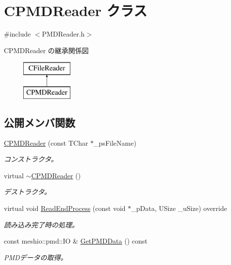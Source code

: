 \hypertarget{class_c_p_m_d_reader}{}\section{C\+P\+M\+D\+Reader クラス}
\label{class_c_p_m_d_reader}


{\ttfamily \#include $<$P\+M\+D\+Reader.\+h$>$}

C\+P\+M\+D\+Reader の継承関係図\begin{figure}[H]
\begin{center}
\leavevmode
\includegraphics[height=2.000000cm]{class_c_p_m_d_reader}
\end{center}
\end{figure}
\subsection*{公開メンバ関数}
\begin{DoxyCompactItemize}
\item 
\hyperlink{class_c_p_m_d_reader_a8d2c4bdfa2c288fe4d3507a26c7f13a7}{C\+P\+M\+D\+Reader} (const T\+Char $\ast$\+\_\+ps\+File\+Name)
\begin{DoxyCompactList}\small\item\em コンストラクタ。 \end{DoxyCompactList}\item 
virtual \hyperlink{class_c_p_m_d_reader_a3e1afba2bd86e420c731ba5c114d2ec5}{$\sim$\+C\+P\+M\+D\+Reader} ()
\begin{DoxyCompactList}\small\item\em デストラクタ。 \end{DoxyCompactList}\item 
virtual void \hyperlink{class_c_p_m_d_reader_a326af26b1815aaa4b088b037fb76e05f}{Read\+End\+Process} (const void $\ast$\+\_\+p\+Data, U\+Size \+\_\+u\+Size) override
\begin{DoxyCompactList}\small\item\em 読み込み完了時の処理。 \end{DoxyCompactList}\item 
const meshio\+::pmd\+::\+I\+O \& \hyperlink{class_c_p_m_d_reader_a082ea64273d18d684b3fc2deced6090f}{Get\+P\+M\+D\+Data} () const 
\begin{DoxyCompactList}\small\item\em P\+M\+Dデータの取得。 \end{DoxyCompactList}\end{DoxyCompactItemize}
